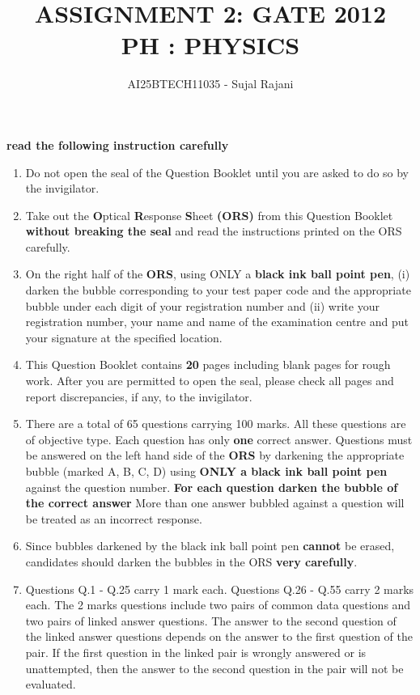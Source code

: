 \documentclass[journal,12pt,onecolumn]{IEEEtran}
\theoremstyle{remark}
\begin{document}
\title{
ASSIGNMENT 2: GATE 2012 \\
    PH : PHYSICS }
\author{AI25BTECH11035 - Sujal Rajani }
\maketitle
\renewcommand{\thefigure}{\theenumi}
\renewcommand{\thetable}{\theenumi}
\textbf{read the following instruction carefully}
\begin{enumerate}
\item Do not open the seal of the Question Booklet until you are asked to do so by the invigilator.

\item Take out the \textbf{O}ptical \textbf{R}esponse \textbf{S}heet \textbf{(ORS)} from this Question Booklet \textbf{without breaking the seal} and read the instructions printed on the ORS carefully.

\item On the right half of the \textbf{ORS}, using ONLY a \textbf{  black ink ball point pen},  (i) darken the bubble corresponding to your test paper code and the appropriate bubble under each digit of your registration number and  (ii) write your registration number, your name and name of the examination centre and put your signature at the specified location.

\item This Question Booklet contains \textbf{20} pages including blank pages for rough work. After you are permitted to open the seal, please check all pages and report discrepancies, if any, to the invigilator.

\item There are a total of 65 questions carrying 100 marks. All these questions are of objective type.  Each question has only \textbf{one} correct answer. Questions must be answered on the left hand side of the \textbf{ORS} by darkening the appropriate bubble (marked A, B, C, D) using \textbf{ONLY a black ink ball point pen} against the question number. \textbf{For each question darken the bubble of the correct answer} More than one answer bubbled against a question will be treated as an incorrect response.

\item Since bubbles darkened by the black ink ball point pen \textbf{cannot} be erased, candidates should darken the bubbles in the ORS \textbf{very carefully}.

\item Questions Q.1 - Q.25 carry 1 mark each. Questions Q.26 - Q.55 carry 2 marks each. The 2 marks questions include two pairs of common data questions and two pairs of linked answer questions. 
The answer to the second question of the linked answer questions depends on the answer to the first question of the pair. If the first question in the linked pair is wrongly answered or is unattempted, then the answer to the second question in the pair will not be evaluated.


\end{enumerate}
\end{document}
